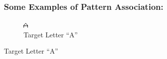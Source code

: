 \documentclass[a4paper,12pt]{report}
\begin{document}
\clearpage

\begin{figure}
\subsubsection*{Some Examples of Pattern Association:}
\vskip 2cm
        \centering
        \begin{subfigure}[h!]{0.3\textwidth}
                \includegraphics[width=\textwidth]{A.png}
                \caption{Target Letter ``A''}
                

\end{subfigure}
\end{figure}
\end{document}
